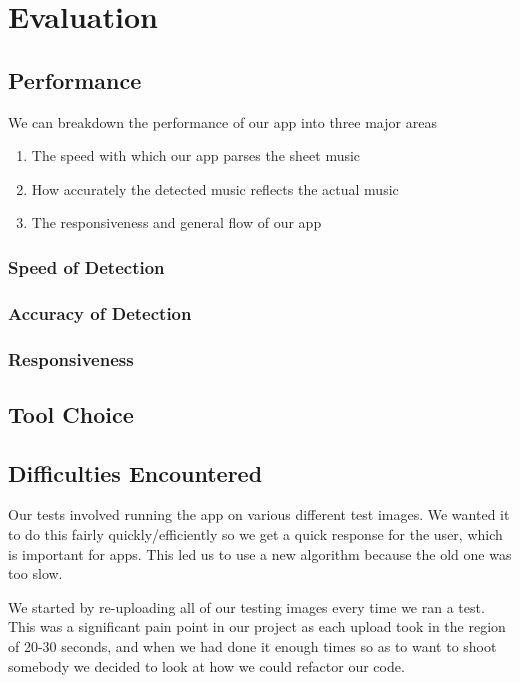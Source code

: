 \section{Evaluation}
    
    \subsection{Performance}
    We can breakdown the performance of our app into three major areas
        \begin{enumerate}
        \item{The speed with which our app parses the sheet music}
        \item{How accurately the detected music reflects the actual music}
        \item{The responsiveness and general flow of our app}
        \end{enumerate}
        \subsubsection{Speed of Detection}
        \subsubsection{Accuracy of Detection}

        \subsubsection{Responsiveness}
    \subsection{Tool Choice}

    \subsection{Difficulties Encountered}

    
Our tests involved running the app on various different test images. We wanted it to do this fairly quickly/efficiently so we get a quick response for the user, which is important for apps. This led us to use a new algorithm because the old one was too slow.

We started by re-uploading all of our testing images every time we ran a test. This was a significant pain point in our project as each upload took in the region of 20-30 seconds, and when we had done it enough times so as to want to shoot somebody we decided to look at how we could refactor our code.

